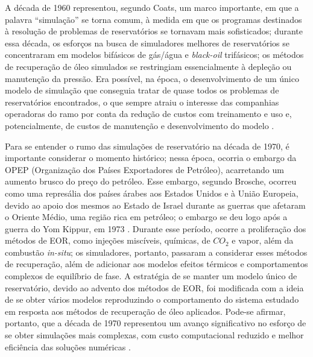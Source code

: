 A d\'{e}cada de 1960 representou, segundo Coats, um marco importante, em que a palavra ``simula\c{c}\~{a}o'' se torna comum, \`{a} medida em que os programas destinados \`{a} resolu\c{c}\~{a}o de problemas de reservat\'{o}rios se tornavam mais sofisticados; durante essa d\'{e}cada, os esfor\c{c}os na busca de simuladores melhores de reservat\'{o}rios se concentraram em modelos bif\'{a}sicos de g\'{a}s/\'{a}gua e \textit{black-oil} trif\'{a}sicos; os m\'{e}todos de recupera\c{c}\~{a}o de \'{o}leo simulados se restringiam essencialmente \`{a} deple\c{c}\~{a}o ou manuten\c{c}\~{a}o da press\~{a}o. Era poss\'{i}vel, na \'{e}poca, o desenvolvimento de um \'{u}nico modelo de simula\c{c}\~{a}o que conseguia tratar de quase todos os problemas de reservat\'{o}rios encontrados, o que sempre atraiu o interesse das companhias operadoras do ramo por conta da redu\c{c}\~{a}o de custos com treinamento e uso e, potencialmente, de custos de manuten\c{c}\~{a}o e desenvolvimento do modelo \cite{coats1982}.

Para se entender o rumo das simula\c{c}\~{o}es de reservat\'{o}rio na d\'{e}cada de 1970, \'{e} importante considerar o momento hist\'{o}rico; nessa \'{e}poca, ocorria o embargo da OPEP (Organiza\c{c}\~{a}o dos Pa\'{i}ses Exportadores de Petr\'{o}leo), acarretando um aumento brusco do pre\c{c}o do petr\'{o}leo. Esse embargo, segundo Brosche, ocorreu como uma repres\'{a}lia dos pa\'{i}ses \'{a}rabes aos Estados Unidos e \`{a} Uni\~{a}o Europeia, devido ao apoio dos mesmos ao Estado de Israel durante as guerras que afetaram o Oriente M\'{e}dio, uma regi\~{a}o rica em petr\'{o}leo; o embargo se deu logo ap\'{o}s a guerra do Yom Kippur, em 1973 \cite{brosche1974}. Durante esse per\'{i}odo, ocorre a prolifera\c{c}\~{a}o dos m\'{e}todos de EOR, como inje\c{c}\~{o}es misc\'{i}veis, qu\'{i}micas, de $CO_2$ e vapor, al\'{e}m da combust\~{a}o \textit{in-situ}; os simuladores, portanto, passaram a considerar esses m\'{e}todos de recupera\c{c}\~{a}o, al\'{e}m de adicionar aos modelos efeitos t\'{e}rmicos e comportamentos complexos de equil\'{i}brio de fase. A estrat\'{e}gia de se manter um modelo \'{u}nico de reservat\'{o}rio, devido ao advento dos m\'{e}todos de EOR, foi modificada com a ideia de se obter v\'{a}rios modelos reproduzindo o comportamento do sistema estudado em resposta aos m\'{e}todos de recupera\c{c}\~{a}o de \'{o}leo aplicados. Pode-se afirmar, portanto, que a d\'{e}cada de 1970 representou um avan\c{c}o significativo no esfor\c{c}o de se obter simula\c{c}\~{o}es mais complexas, com custo computacional reduzido e melhor efici\^{e}ncia das solu\c{c}\~{o}es num\'{e}ricas \cite{coats1982}.

